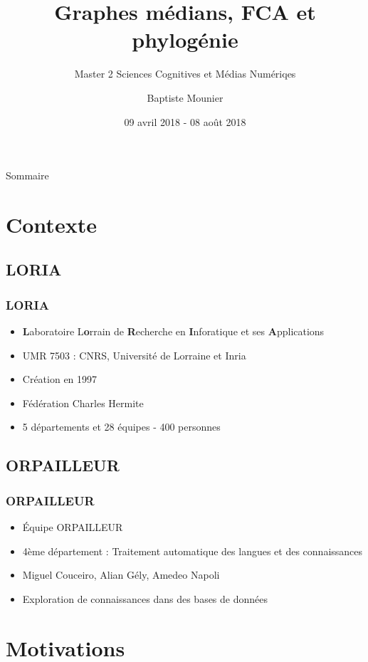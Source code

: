 \documentclass{beamer}
\title{Graphes médians, FCA et phylogénie}
\subtitle{Master 2 Sciences Cognitives et Médias Numériqes}
\author{Baptiste Mounier}
\institute{UFR Mathématiques et Informatique \and LORIA}
\date{09 avril 2018 - 08 août 2018}
\begin{document}
\begin{frame}[plain]
	\titlepage
\end{frame}

\begin{frame}{Sommaire}
	\tableofcontents[hideallsubsections]
\end{frame}


\section{Contexte}

\subsection{LORIA}

\begin{frame}
	\frametitle{LORIA}
	\begin{itemize}
		\item {\bf L}aboratoire L{\bf o}rrain de {\bf R}echerche en {\bf I}nforatique et ses {\bf A}pplications
		\item UMR 7503 : CNRS, Université de Lorraine et Inria
		\item Création en 1997
		\item Fédération Charles Hermite
		\item 5 départements et 28 équipes - 400 personnes
	\end{itemize}
\end{frame}

\subsection{ORPAILLEUR}
\begin{frame}
	\frametitle{ORPAILLEUR}
	\begin{itemize}
		\item Équipe ORPAILLEUR
		\item 4ème département : Traitement automatique des langues et des connaissances
		\item Miguel Couceiro, Alian Gély, Amedeo Napoli
		\item Exploration de connaissances dans des bases de données
	\end{itemize}
\end{frame}

\section{Motivations}
\end{document}
